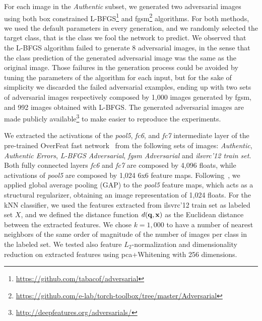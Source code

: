 For each image in the \emph{Authentic} subset, we generated two adversarial images using both box constrained L-BFGS\footnote{\url{https://github.com/tabacof/adversarial}} and \gls{fgsm}\footnote{\url{https://github.com/e-lab/torch-toolbox/tree/master/Adversarial}} algorithms.
For both methods, we used the default parameters in every generation, and we randomly selected the target class, that is the class we fool the network to predict.
We observed that the L-BFGS algorithm failed to generate 8 adversarial images, in the sense that the class prediction of the generated adversarial image was the same as the original image.
Those failures in the generation process could be avoided by tuning the parameters of the algorithm for each input, but for the sake of simplicity we discarded the failed adversarial examples, ending up with two sets of adversarial images respectively composed by 1,000 images generated by \gls{fgsm}, and 992 images obtained with L-BFGS.
The generated adversarial images are made publicly available\footnote{\url{http://deepfeatures.org/adversarials/}} to make easier to reproduce the experiments.

We extracted the activations of the \emph{pool5}, \emph{fc6}, and \emph{fc7} intermediate layer of the pre-trained OverFeat fast network~\cite{sermanet2013overfeat} from the following sets of images: \emph{Authentic}, \emph{Authentic Errors}, \emph{L-BFGS Adversarial}, \emph{\gls{fgsm} Adversarial} and \emph{\gls{ilsvrc}'12 train set}.
Both fully connected layers \emph{fc6} and \emph{fc7} are composed by 4,096 floats, while activations of \emph{pool5} are composed by 1,024 6x6 feature maps.
Following~\cite{simonyan2014very}, we applied global average pooling (GAP) to the \emph{pool5} feature maps, which acts as a structural regularizer, obtaining an image representation of 1,024 floats.
For the kNN classifier, we used the features extracted from \gls{ilsvrc}'12 train set as labeled set $X$, and we defined the distance function $d(\mathbf{q},\mathbf{x})$ as the Euclidean distance between the extracted features.
We chose $k=1,000$ to have a number of nearest neighbors of the same order of magnitude of the number of images per class in the labeled set. %
We tested also feature $L_2$-normalization and dimensionality reduction on extracted features using \gls{pca}+Whitening with 256 dimensions.

